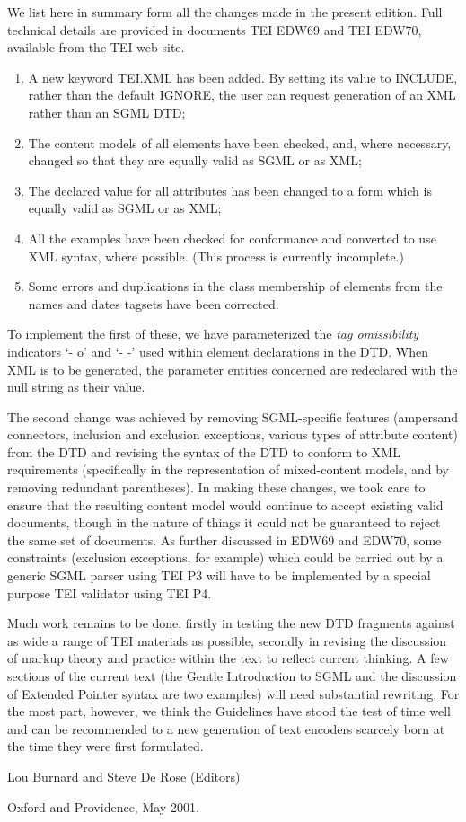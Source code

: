 We list here in summary form all the changes made in the present edition. Full technical details are provided in documents TEI EDW69 and TEI EDW70, available from the TEI web site. \begin{enumerate}
\item A new keyword \textsf{TEI.XML} has been added. By setting its value to INCLUDE, rather than the default IGNORE, the user can request generation of an XML rather than an SGML DTD;
\item The content models of all elements have been checked, and, where necessary, changed so that they are equally valid as SGML or as XML; 
\item The declared value for all attributes has been changed to a form which is equally valid as SGML or as XML;
\item All the examples have been checked for conformance and converted to use XML syntax, where possible. (This process is currently incomplete.)
\item Some errors and duplications in the class membership of elements from the names and dates tagsets have been corrected. 
\end{enumerate}\par
To implement the first of these, we have parameterized the \textit{tag omissibility} indicators ‘- o’ and ‘- -’ used within element declarations in the DTD. When XML is to be generated, the parameter entities concerned are redeclared with the null string as their value.\par
The second change was achieved by removing SGML-specific features (ampersand connectors, inclusion and exclusion exceptions, various types of attribute content) from the DTD and revising the syntax of the DTD to conform to XML requirements (specifically in the representation of mixed-content models, and by removing redundant parentheses). In making these changes, we took care to ensure that the resulting content model would continue to accept existing valid documents, though in the nature of things it could not be guaranteed to reject the same set of documents. As further discussed in EDW69 and EDW70, some constraints (exclusion exceptions, for example) which could be carried out by a generic SGML parser using TEI P3 will have to be implemented by a special purpose TEI validator using TEI P4. \par
Much work remains to be done, firstly in testing the new DTD fragments against as wide a range of TEI materials as possible, secondly in revising the discussion of markup theory and practice within the text to reflect current thinking. A few sections of the current text (the Gentle Introduction to SGML and the discussion of Extended Pointer syntax are two examples) will need substantial rewriting. For the most part, however, we think the Guidelines have stood the test of time well and can be recommended to a new generation of text encoders scarcely born at the time they were first formulated. \par
Lou Burnard and Steve De Rose (Editors)\par
Oxford and Providence, May 2001.
